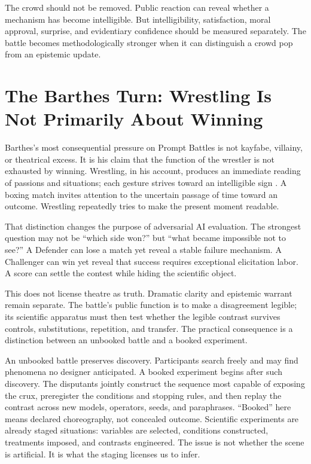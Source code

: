 \documentclass[11pt]{article}
\begin{document}
The crowd should not be removed. Public reaction can reveal whether a mechanism has become intelligible. But intelligibility, satisfaction, moral approval, surprise, and evidentiary confidence should be measured separately. The battle becomes methodologically stronger when it can distinguish a crowd pop from an epistemic update.

\section{The Barthes Turn: Wrestling Is Not Primarily About Winning}
Barthes's most consequential pressure on Prompt Battles is not kayfabe, villainy, or theatrical excess. It is his claim that the function of the wrestler is not exhausted by winning. Wrestling, in his account, produces an immediate reading of passions and situations; each gesture strives toward an intelligible sign \cite{barthes1972wrestling}. A boxing match invites attention to the uncertain passage of time toward an outcome. Wrestling repeatedly tries to make the present moment readable.

That distinction changes the purpose of adversarial AI evaluation. The strongest question may not be ``which side won?'' but ``what became impossible not to see?'' A Defender can lose a match yet reveal a stable failure mechanism. A Challenger can win yet reveal that success requires exceptional elicitation labor. A score can settle the contest while hiding the scientific object.

This does not license theatre as truth. Dramatic clarity and epistemic warrant remain separate. The battle's public function is to make a disagreement legible; its scientific apparatus must then test whether the legible contrast survives controls, substitutions, repetition, and transfer. The practical consequence is a distinction between an unbooked battle and a booked experiment.

An unbooked battle preserves discovery. Participants search freely and may find phenomena no designer anticipated. A booked experiment begins after such discovery. The disputants jointly construct the sequence most capable of exposing the crux, preregister the conditions and stopping rules, and then replay the contrast across new models, operators, seeds, and paraphrases. ``Booked'' here means declared choreography, not concealed outcome. Scientific experiments are already staged situations: variables are selected, conditions constructed, treatments imposed, and contrasts engineered. The issue is not whether the scene is artificial. It is what the staging licenses us to infer.
\end{document}
